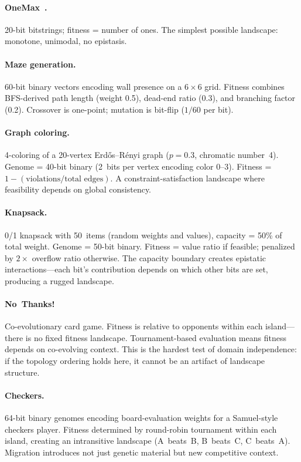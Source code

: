 \documentclass[dvipsnames,format=sigconf,anonymous=true,review=false]{acmart}
\begin{document}
\paragraph{OneMax~\cite{mitchell1992royal}.}
20-bit bitstrings; fitness = number of ones. The simplest possible landscape: monotone, unimodal, no epistasis.

\paragraph{Maze generation.}
60-bit binary vectors encoding wall presence on a $6 \times 6$ grid. Fitness combines BFS-derived path length (weight 0.5), dead-end ratio (0.3), and branching factor (0.2). Crossover is one-point; mutation is bit-flip ($1/60$ per bit).

\paragraph{Graph coloring.}
4-coloring of a 20-vertex Erd\H{o}s--R\'{e}nyi graph ($p = 0.3$, chromatic number~4). Genome = 40-bit binary (2~bits per vertex encoding color 0--3). Fitness = $1 - (\text{violations}/\text{total edges})$. A constraint-satisfaction landscape where feasibility depends on global consistency.

\paragraph{Knapsack.}
0/1 knapsack with 50~items (random weights and values), capacity = 50\% of total weight. Genome = 50-bit binary. Fitness = value ratio if feasible; penalized by $2\times$ overflow ratio otherwise. The capacity boundary creates epistatic interactions---each bit's contribution depends on which other bits are set, producing a rugged landscape.

\paragraph{No~Thanks!}
Co-evolutionary card game. Fitness is relative to opponents within each island---there is no fixed fitness landscape. Tournament-based evaluation means fitness depends on co-evolving context. This is the hardest test of domain independence: if the topology ordering holds here, it cannot be an artifact of landscape structure.

\paragraph{Checkers.}
64-bit binary genomes encoding board-evaluation weights for a Samuel-style~\cite{samuel1959checkers} checkers player. Fitness determined by round-robin tournament within each island, creating an intransitive landscape (A~beats~B, B~beats~C, C~beats~A). Migration introduces not just genetic material but new competitive context.
\end{document}
